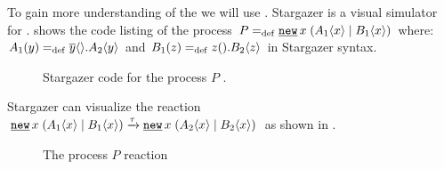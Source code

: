To gain more understanding of the \picalc{} we will use \cite{stargazer}. Stargazer is a visual simulator for \picalc{}.  shows the code listing of the process $P\define\procres{x}{(\procpar{\proccall{A_1}{x}}{\proccall{B_1}{x}})}$ where: $A_1(y)=_{\mathrm{def}}{}\overline{y}\langle{}\rangle.A_2\langle y\rangle$ and $B_1(z)=_{\mathrm{def}}{}z({}).B_2\langle z\rangle$ in Stargazer syntax.
\begin{figure}[ht!]

\caption{Stargazer code for the process $P$ .}
\label{pi_visualization_stargazer_code}
\end{figure}
\raggedbottom

Stargazer can visualize the reaction $\procres{x}{(\procpar{\proccall{A_1}{x}}{\proccall{B_1}{x}})} \transs{\tau} \procres{x}{(\procpar{\proccall{A_2}{x}}{\proccall{B_2}{x}})}$ as shown in
.

\begin{figure}[H]%
\centering
{}%
\hfill
{}%
\caption{The process $P$ reaction}
\label{pi_visualization_stargazer_reaction}%
\end{figure}